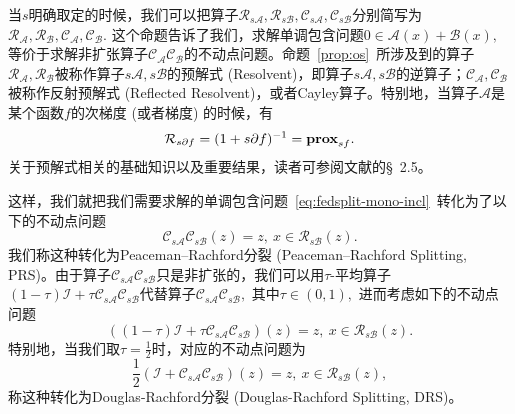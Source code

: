 \begin{rem}
\label{rem:resolvent}
当$s$明确取定的时候，我们可以把算子$\mathcal{R}_{s\mathcal{A}}, \mathcal{R}_{s\mathcal{B}}, \mathcal{C}_{s\mathcal{A}}, \mathcal{C}_{s\mathcal{B}}$分别简写为$\mathcal{R}_{\mathcal{A}}, \mathcal{R}_{\mathcal{B}}, \mathcal{C}_{\mathcal{A}}, \mathcal{C}_{\mathcal{B}}.$ 这个命题告诉了我们，求解单调包含问题$0 \in \mathcal{A}(x) + \mathcal{B}(x),$等价于求解非扩张算子$\mathcal{C}_{\mathcal{A}} \mathcal{C}_{\mathcal{B}}$的不动点问题。命题~\ref{prop:os}~所涉及到的算子$\mathcal{R}_{\mathcal{A}}, \mathcal{R}_{\mathcal{B}}$被称作算子$s\mathcal{A}, s\mathcal{B}$的预解式 (Resolvent)，即算子$s\mathcal{A}, s\mathcal{B}$的逆算子；$\mathcal{C}_{\mathcal{A}}, \mathcal{C}_{\mathcal{B}}$被称作反射预解式 (Reflected Resolvent)，或者Cayley算子。特别地，当算子$\mathcal{A}$是某个函数$f$的次梯度 (或者梯度) 的时候，有
\begin{equation}
\label{eq:resolvent-prox-relation}
\mathcal{R}_{s\partial f} = (1 + s\partial f)^{-1} = \mathbf{prox}_{sf}.
\end{equation}
关于预解式相关的基础知识以及重要结果，读者可参阅文献\parencite{ryu2022large}的\S~2.5。
\end{rem}

这样，我们就把我们需要求解的单调包含问题~\eqref{eq:fedsplit-mono-incl}~转化为了以下的不动点问题
\begin{equation}
\label{eq:fixed-pt-pr}
\mathcal{C}_{s\mathcal{A}} \mathcal{C}_{s\mathcal{B}} (z) = z, ~ x \in \mathcal{R}_{s\mathcal{B}} (z).
\end{equation}
我们称这种转化为Peaceman–Rachford分裂 (Peaceman–Rachford Splitting, PRS)\cite{Peaceman_1955_prsm,Lions_1979_splitting}。由于算子$\mathcal{C}_{s\mathcal{A}} \mathcal{C}_{s\mathcal{B}}$只是非扩张的，我们可以用$\tau$-平均算子$(1 - \tau) \mathcal{I} + \tau \mathcal{C}_{s\mathcal{A}} \mathcal{C}_{s\mathcal{B}}$代替算子$\mathcal{C}_{s\mathcal{A}} \mathcal{C}_{s\mathcal{B}},$ 其中$\tau \in (0, 1),$ 进而考虑如下的不动点问题
\begin{equation}
\label{eq:fixed-pt-general}
((1 - \tau) \mathcal{I} + \tau \mathcal{C}_{s\mathcal{A}} \mathcal{C}_{s\mathcal{B}}) (z) = z, ~ x \in \mathcal{R}_{s\mathcal{B}} (z).
\end{equation}
特别地，当我们取$\tau = \frac{1}{2}$时，对应的不动点问题为
\begin{equation}
\label{eq:fixed-pt-dr}
\frac{1}{2}(\mathcal{I} + \mathcal{C}_{s\mathcal{A}} \mathcal{C}_{s\mathcal{B}}) (z) = z, ~ x \in \mathcal{R}_{s\mathcal{B}} (z),
\end{equation}
称这种转化为Douglas-Rachford分裂 (Douglas-Rachford Splitting, DRS)\cite{Douglas_1956_drsm,Lions_1979_splitting}。

